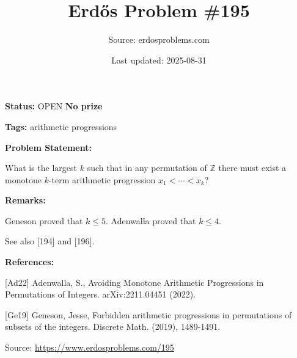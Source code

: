 \documentclass{article}
\title{Erd\H{o}s Problem \#195}
\date{Last updated: 2025-08-31}
\author{Source: erdosproblems.com}
\begin{document}
\maketitle

\noindent\textbf{Status:} OPEN \quad \textbf{No prize}

\noindent\textbf{Tags:} arithmetic progressions

\medskip
\noindent\textbf{Problem Statement:}

What is the largest $k$ such that in any permutation of $\mathbb{Z}$ there must exist a monotone $k$-term arithmetic progression $x_1<\cdots<x_k$?

\bigskip
\noindent\textbf{Remarks:}

Geneson \cite{Ge19} proved that $k\leq 5$. Adenwalla \cite{Ad22} proved that $k\leq 4$.

See also [194] and [196].

\bigskip
\noindent\textbf{References:}

[Ad22] Adenwalla, S., Avoiding Monotone Arithmetic Progressions in Permutations of Integers. arXiv:2211.04451 (2022).
 
 [Ge19] Geneson, Jesse, Forbidden arithmetic progressions in permutations of subsets
of the integers. Discrete Math. (2019), 1489-1491.

\bigskip
\noindent\small{Source: \url{https://www.erdosproblems.com/195}}
\end{document}
